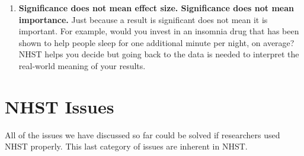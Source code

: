 \documentclass[
]{book}
\providecommand{\tightlist}{%
  \setlength{\itemsep}{0pt}\setlength{\parskip}{0pt}}
\begin{document}
\begin{enumerate}
\def\labelenumi{\arabic{enumi}.}
\setcounter{enumi}{3}
\tightlist
\item
  \textbf{Significance does not mean effect size. Significance does not mean importance.} Just because a result is significant does not mean it is important. For example, would you invest in an insomnia drug that has been shown to help people sleep for one additional minute per night, on average? NHST helps you decide but going back to the data is needed to interpret the real-world meaning of your results.
\end{enumerate}

\hypertarget{nhst-issues}{%
\section{NHST Issues}\label{nhst-issues}}

All of the issues we have discussed so far could be solved if researchers used NHST properly. This last category of issues are inherent in NHST.
\end{document}
